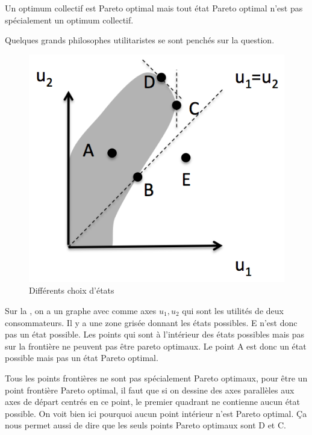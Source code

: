 Un optimum collectif est Pareto optimal mais tout état Pareto optimal
n'est pas spécialement un optimum collectif.

Quelques grands philosophes utilitaristes se sont penchés sur la question.
\begin{figure}
  \centering
  \includegraphics{pareto.png}
  \caption{Différents choix d'états}
  \label{fig:pareto}
\end{figure}
Sur la ,
on a un graphe avec comme axes $u_1,u_2$ qui sont les
utilités de deux consommateurs.
Il y a une zone grisée donnant les états possibles.
E n'est donc pas un état possible.
Les points qui sont à l'intérieur des états possibles mais pas sur
la frontière ne peuvent pas être pareto optimaux.
Le point A est donc un état possible mais pas un état Pareto optimal.

Tous les points frontières ne sont pas spécialement Pareto optimaux,
pour être un point frontière Pareto optimal,
il faut que si on dessine des axes parallèles aux axes de départ
centrés en ce point, le premier quadrant ne contienne aucun état possible.
On voit bien ici pourquoi aucun point intérieur n'est Pareto optimal.
Ça nous permet aussi de dire que les seuls points Pareto optimaux sont
D et C.

